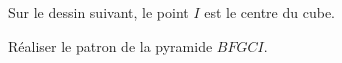 
\begin{exercice}\label{exo2smath-0187}

    Sur le dessin suivant, le point \( I\) est le centre du cube.

\begin{center}
   
\end{center}

    Réaliser le patron de la pyramide \( BFGCI\).

\end{exercice}
